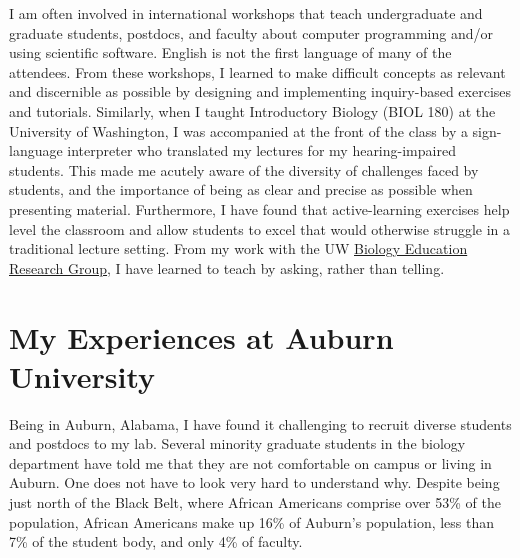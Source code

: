 I am often involved in international workshops that teach undergraduate and
graduate students, postdocs, and faculty about computer programming and/or
using scientific software.
English is not the first language of many of the attendees.
From these workshops, I learned to make difficult concepts as relevant and
discernible as possible by designing and implementing inquiry-based exercises
and tutorials.
Similarly, when I taught Introductory Biology (BIOL 180) at the University of
Washington, I was accompanied at the front of the class by a sign-language
interpreter who translated my lectures for my hearing-impaired students.
This made me acutely aware of the diversity of challenges faced by
students, and the importance of being as clear and precise as possible when
presenting material.
Furthermore, I have found that active-learning exercises help level the
classroom and allow students to excel that would otherwise struggle in a
traditional lecture setting.
From my work with the UW
\href{https://sites.google.com/site/uwbioedresgroup/home}{Biology Education
    Research Group}, I have learned to teach by asking, rather than telling.


\section*{My Experiences at Auburn University}
Being in Auburn, Alabama, I have found it challenging to recruit diverse
students and postdocs to my lab.
Several minority graduate students in the biology department have told me that
they are not comfortable on campus or living in Auburn.
One does not have to look very hard to understand why.
Despite being just north of the Black Belt,
where African Americans comprise over 53\% of the population,
African Americans make up
16\% of Auburn's population, less than 7\% of the student body,
and only 4\% of faculty.

